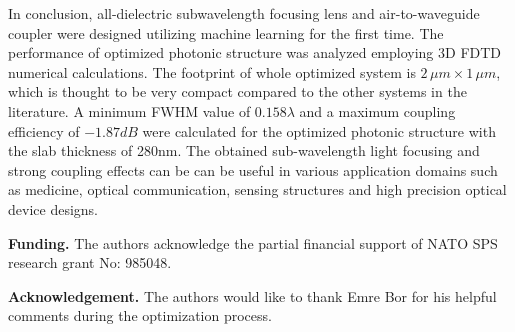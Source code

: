 \documentclass[9pt,twocolumn,twoside]{article}
\begin{document}
  In conclusion, all-dielectric subwavelength focusing lens and air-to-waveguide coupler were designed utilizing machine learning for the first time. The performance of optimized photonic structure was analyzed employing 3D FDTD numerical calculations. The footprint of whole optimized system is $2\,\mu m\times 1\,\mu m$, which is thought to be very compact compared to the other systems in the literature. A minimum FWHM value of $0.158 \lambda$ and a maximum coupling efficiency of $-1.87dB$ were calculated for the optimized photonic structure with the slab thickness of 280nm. The obtained sub-wavelength light focusing and strong coupling effects can be can be useful in various application domains such as medicine, optical communication, sensing structures and high precision optical device designs.
  
  {\bf Funding.} The authors acknowledge the partial financial support of NATO SPS research grant No: 985048.
  
  {\bf Acknowledgement.} The authors would like to thank Emre Bor for his helpful comments during the optimization process. 
  
  
  
\end{document}
